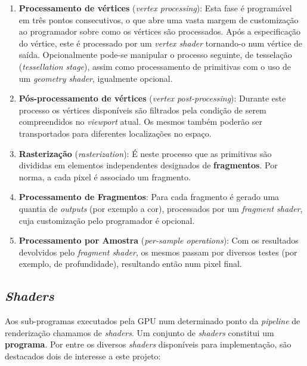 \begin{enumerate}
    \item \textbf{Processamento de vértices} (\textit{vertex processing}):
    Esta fase é programável em três pontos consecutivos, o que abre uma vasta margem de customização ao programador sobre como os vértices são processados.
    Após a especificação do vértice, este é processado por um \textit{vertex shader} tornando-o num vértice de saída. Opcionalmente pode-se manipular o processo seguinte, de tesselação (\textit{tessellation stage}), assim como processamento de primitivas com o uso de um \textit{geometry shader}, igualmente opcional.
    
    \item \textbf{Pós-processamento de vértices} (\textit{vertex post-processing}):
    Durante este processo os vértices disponíveis são filtrados pela condição de serem compreendidos no \textit{viewport} atual. Os mesmos também poderão ser transportados para diferentes localizações no espaço.
    
    \item \textbf{Rasterização} (\textit{rasterization}):
    É neste processo que as primitivas são divididas em elementos independentes designados de \textbf{fragmentos}. Por norma, a cada pixel é associado um fragmento.
    
    \item \textbf{Processamento de Fragmentos}:
    Para cada fragmento é gerado uma quantia de \textit{outputs} (por exemplo a cor), processados por um \textit{fragment shader}, cuja customização pelo programador é opcional.
    
    \item \textbf{Processamento por Amostra} (\textit{per-sample operations}): Com os resultados devolvidos pelo \textit{fragment shader}, os mesmos passam por diversos testes (por exemplo, de profundidade), resultando então num pixel final.
\end{enumerate}


\subsection{\textit{Shaders}}
\label{ssec::arte:opengl:shaders}

Aos sub-programas executados pela \ac{GPU} num determinado ponto da \textit{pipeline} de renderização chamamos de \textit{shaders}. Um conjunto de \textit{shaders} constitui um \textbf{programa}. Por entre os diversos \textit{shaders} disponíveis para implementação, são destacados dois de interesse a este projeto:

